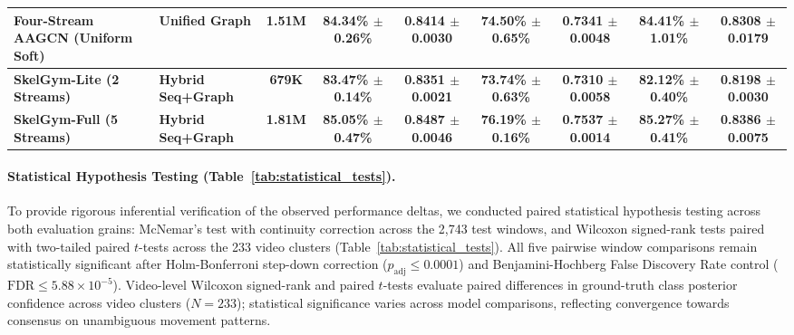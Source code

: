 \documentclass[runningheads]{llncs}
\begin{document}
\begin{table}[!t]
{\begin{tabular}{l l c c c c c c c}
Four-Stream AAGCN (Uniform Soft)  & Unified Graph        & 1.51M & 84.34\% $\pm$ 0.26\% & 0.8414 $\pm$ 0.0030 & 74.50\% $\pm$ 0.65\% & 0.7341 $\pm$ 0.0048 & 84.41\% $\pm$ 1.01\% & 0.8308 $\pm$ 0.0179 \\
\midrule
\textbf{SkelGym-Lite (2 Streams)} & \textbf{Hybrid Seq+Graph} & \textbf{679K} & \textbf{83.47\% $\pm$ 0.14\%} & \textbf{0.8351 $\pm$ 0.0021} & \textbf{73.74\% $\pm$ 0.63\%} & \textbf{0.7310 $\pm$ 0.0058} & \textbf{82.12\% $\pm$ 0.40\%} & \textbf{0.8198 $\pm$ 0.0030} \\
\textbf{SkelGym-Full (5 Streams)} & \textbf{Hybrid Seq+Graph} & \textbf{1.81M} & \textbf{85.05\% $\pm$ 0.47\%} & \textbf{0.8487 $\pm$ 0.0046} & \textbf{76.19\% $\pm$ 0.16\%} & \textbf{0.7537 $\pm$ 0.0014} & \textbf{85.27\% $\pm$ 0.41\%} & \textbf{0.8386 $\pm$ 0.0075} \\
\bottomrule
\end{tabular}
}
\end{table}

\paragraph{Statistical Hypothesis Testing (Table~\ref{tab:statistical_tests}).}
To provide rigorous inferential verification of the observed performance deltas, we conducted paired statistical hypothesis testing across both evaluation grains: McNemar's test with continuity correction \cite{mcnemar1947} across the 2,743 test windows, and Wilcoxon signed-rank tests \cite{wilcoxon1945} paired with two-tailed paired $t$-tests across the 233 video clusters (Table~\ref{tab:statistical_tests}). All five pairwise window comparisons remain statistically significant after Holm-Bonferroni step-down correction ($p_{\text{adj}} \le 0.0001$) and Benjamini-Hochberg False Discovery Rate control ($\text{FDR} \le 5.88 \times 10^{-5}$). Video-level Wilcoxon signed-rank and paired $t$-tests evaluate paired differences in ground-truth class posterior confidence across video clusters ($N=233$); statistical significance varies across model comparisons, reflecting convergence towards consensus on unambiguous movement patterns.
\end{document}

